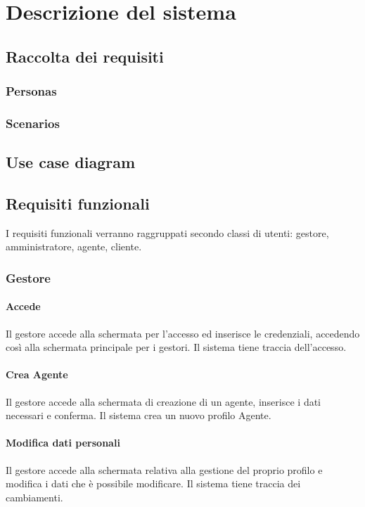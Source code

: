 \chapter{Descrizione del sistema}
\section{Raccolta dei requisiti}
\subsection{Personas}

\subsection{Scenarios}

\section{Use case diagram}
\begin{center}
\end{center}
\section{Requisiti funzionali}
I requisiti funzionali verranno raggruppati secondo
classi di utenti: gestore, amministratore, agente, cliente.

\subsection{Gestore}
\subsubsection{Accede}
Il gestore accede alla schermata per l'accesso ed inserisce 
le credenziali, accedendo così alla schermata principale per 
i gestori. Il sistema tiene traccia dell'accesso.
\subsubsection{Crea Agente}
Il gestore accede alla schermata di creazione di un agente, 
inserisce i dati necessari e conferma. Il sistema crea un 
nuovo profilo Agente.
\subsubsection{Modifica dati personali}
Il gestore accede alla schermata relativa alla gestione del 
proprio profilo e modifica i dati che è possibile modificare. 
Il sistema tiene traccia dei cambiamenti.